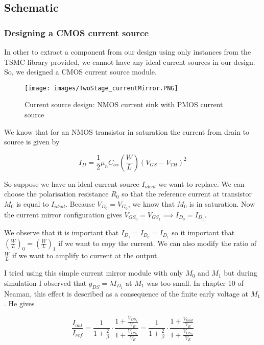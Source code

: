 \documentclass[a4paper,12pt,twoside]{article}
\begin{document}
	\subsection{Schematic}
	
	\subsubsection{Designing a CMOS current source}
	
	In other to extract a component from our design using only instances from the TSMC library provided, we cannot have any ideal current sources in our design. So, we designed a CMOS current source module.
	
	\begin{figure}[h!]
		\centering
		\texttt{[image: images/TwoStage\_currentMirror.PNG]}
		\label{Current_Source}
		\caption{Current source design: NMOS current sink with PMOS current source}
	\end{figure}
	
	We know that for an NMOS transistor in saturation the current from drain to source is given by
	
	\begin{equation}
		I_D = \frac{1}{2} \mu_n C_{ox} \left( \frac{W}{L} \right) (V_{GS} - V_{TH})^2
	\end{equation} 
	
	So suppose we have an ideal current source $I_{ideal}$ we want to replace. We can choose the polarisation resistance $R_0$ so that the reference current at transistor $M_0$ is equal to $I_{ideal}$. Because $V_{D_0} = V_{G_0}$, we know that $M_0$ is in saturation. Now the current mirror configuration gives $V_{GS_0} = V_{GS_1} \implies I_{D_0} = I_{D_1}$.
	
	We observe that it is important that $I_{D_1} = I_{D_0} = I_{D_1}$ so it important that $\left(\frac{W}{L}\right)_0 = \left(\frac{W}{L}\right)_1$ if we want to copy the current. We can also modify the ratio of $\frac{W}{L}$ if we want to amplify to current at the output.
	
	I tried using this simple current mirror module with only $M_0$ and $M_1$ but during simulation I observed that $g_{DS} = \lambda I_{D_1}$ at $M_1$ was too small. In chapter 10 of Neaman\cite{CurrentS}, this effect is described as a consequence of the finite early voltage at $M_1$. He gives
	
	\begin{equation}
		\frac{I_{out}}{I_{ref}} = \frac{1}{1 + \frac{2}{\beta}} \cdot \frac{1 + \frac{V_{DS_1}}{V_E}}{1 + \frac{V_{DS_0}}{V_E}} = \frac{1}{1 + \frac{2}{\beta}} \cdot \frac{1 + \frac{V_{load}}{V_E}}{1 + \frac{V_{GS_0}}{V_E}}
	\end{equation}
	
\end{document}
